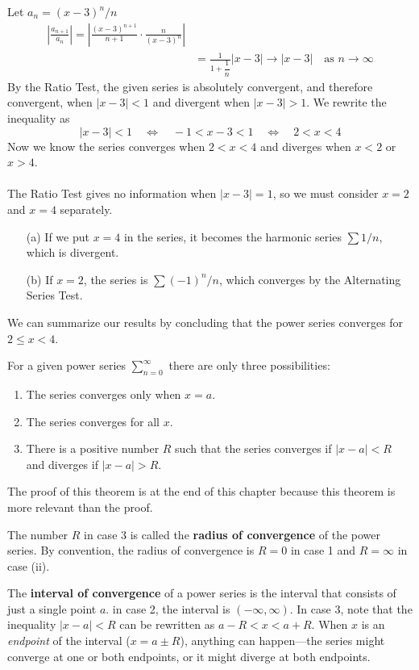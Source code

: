   \begin{solution}
    Let $a_n = (x-3)^n/n$
    \begin{align*}
      \left|\frac{a_{n+1}}{a_n}\right| = \left| \frac{(x-3)^{n+1}}{n+1} \cdot \frac{n}{(x-3)^n} \right| \\
      &= \frac{1}{1+\dfrac{1}{n}} |x-3| \to |x-3| \quad\text{as } n\to\infty
    \end{align*}
    By the Ratio Test, the given series is absolutely convergent, and therefore convergent, when $|x-3|<1$ and divergent when $|x-3|>1$. We rewrite the inequality as
    $$ |x-3|<1 \quad\Longleftrightarrow\quad -1<x-3<1 \quad\Longleftrightarrow\quad 2<x<4 $$
    Now we know the series converges when $2<x<4$ and diverges when $x<2$ or $x>4$.
    \\~\\
    The Ratio Test gives no information when $|x-3|=1$, so we must consider $x=2$ and $x=4$ separately.
    \begin{enumerate}
    \item[(a)] If we put $x=4$ in the series, it becomes the harmonic series $\sum 1/n$, which is divergent.
    \item[(b)] If $x=2$, the series is $\sum (-1)^n/n$, which converges by the Alternating Series Test.
    \end{enumerate}
    We can summarize our results by concluding that the power series converges for $2 \leq x < 4$.
  \end{solution}
  \begin{theorem}
    For a given power series $\displaystyle \sum_{n=0}^{\infty}$ there are only three possibilities:
    \begin{enumerate}
      \item The series converges only when $x=a$.
      \item The series converges for all $x$.
      \item There is a positive number $R$ such that the series converges if $|x-a|<R$ and diverges if $|x-a|>R$.
    \end{enumerate}
    The proof of this theorem is at the end of this chapter because this theorem is more relevant than the proof.
  \end{theorem}
  The number $R$ in case 3 is called the \textbf{radius of convergence} of the power series. By convention, the radius of convergence is $R=0$ in case 1 and $R=\infty$ in case (ii).\par
  The \textbf{interval of convergence} of a power series is the interval that consists of just a single point $a$. in case 2, the interval is $(-\infty,\infty)$. In case 3, note that the inequality $|x-a|<R$ can be rewritten as $a-R<x<a+R$. When $x$ is an \textit{endpoint} of the interval ($x=a \pm R$), anything can happen---the series might converge at one or both endpoints, or it might diverge at both endpoints. \par
